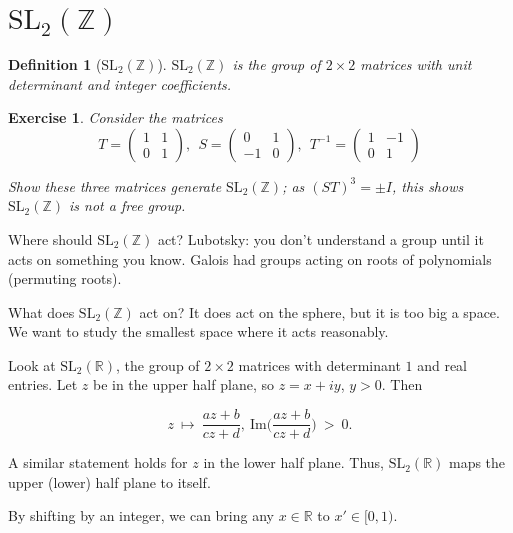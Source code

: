 \documentclass[12pt,letterpaper]{report}
\newcommand\be{\begin{equation}}
\newcommand\ee{\end{equation}}
\newcommand{\R}{\ensuremath{\mathbb{R}}}
\newcommand{\Z}{\ensuremath{\mathbb{Z}}}
\newtheorem{defi}[thm]{Definition}
\newtheorem{exe}[thm]{Exercise}
\begin{document}
\section{$\text{SL}_2(\Z)$}

\begin{defi}[$\text{SL}_2(\Z)$] $\text{SL}_2(\Z)$ is the group of $2 \times 2$
matrices with unit determinant and integer coefficients.
\end{defi}

\begin{exe} Consider the matrices
\be T = \left(\begin{array}{cc}
                        1 &  1  \\
                        0   & 1
                          \end{array}\right), \ \
S = \left(\begin{array}{cc}
                        0 &  1  \\
                        -1   & 0
                          \end{array}\right), \ \
 T^{-1} = \left(\begin{array}{cc}
                        1 &  -1  \\
                        0   & 1
                          \end{array}\right)
\ee

Show these three matrices generate $\text{SL}_2(\Z)$; as $(ST)^3 =
\pm I$, this shows $\text{SL}_2(\Z)$ is not a free group.

\end{exe}

Where should $\text{SL}_2(\Z)$ act? Lubotsky: you don't understand
a group until it acts on something you know. Galois had groups
acting on roots of polynomials (permuting roots).

What does $\text{SL}_2(\Z)$ act on? It does act on the sphere, but
it is too big a space. We want to study the smallest space where
it acts reasonably.

Look at $\text{SL}_2(\R)$, the group of $2 \times 2$ matrices with
determinant $1$ and real entries. Let $z$ be in the upper half
plane, so $z = x + iy$, $y > 0$. Then

\be z \ \mapsto \ \frac{az+b}{cz+d}, \
\text{Im}\Big(\frac{az+b}{cz+d}\Big) \ > \ 0. \ee

A similar statement holds for $z$ in the lower half plane. Thus,
$\text{SL}_2(\R)$ maps the upper (lower) half plane to itself.

By shifting by an integer, we can bring any $x \in \R$ to $x' \in
[0,1)$.
\end{document}
